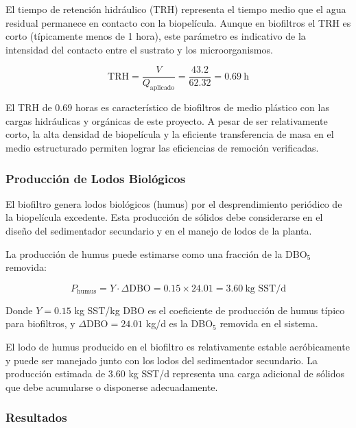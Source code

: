\documentclass[12pt,a4paper]{article}
\begin{document}
El tiempo de retención hidráulico (TRH) representa el tiempo medio que el agua residual permanece en contacto con la biopelícula. Aunque en biofiltros el TRH es corto (típicamente menos de 1 hora), este parámetro es indicativo de la intensidad del contacto entre el sustrato y los microorganismos.

\begin{equation}
\text{TRH} = \frac{V}{Q_{\text{aplicado}}} = \frac{43.2}{62.32} = 0.69\ \text{h}
\end{equation}

El TRH de 0.69 horas es característico de biofiltros de medio plástico con las cargas hidráulicas y orgánicas de este proyecto. A pesar de ser relativamente corto, la alta densidad de biopelícula y la eficiente transferencia de masa en el medio estructurado permiten lograr las eficiencias de remoción verificadas.

\subsubsection*{Producción de Lodos Biológicos}

El biofiltro genera lodos biológicos (humus) por el desprendimiento periódico de la biopelícula excedente. Esta producción de sólidos debe considerarse en el diseño del sedimentador secundario y en el manejo de lodos de la planta.

La producción de humus puede estimarse como una fracción de la DBO$_5$ removida:

\begin{equation}
P_{\text{humus}} = Y \cdot \Delta\text{DBO} = 0.15 \times 24.01 = 3.60\ \text{kg SST/d}
\end{equation}

Donde $Y = 0.15$ kg SST/kg DBO es el coeficiente de producción de humus típico para biofiltros, y $\Delta\text{DBO} = 24.01$ kg/d es la DBO$_5$ removida en el sistema.

El lodo de humus producido en el biofiltro es relativamente estable aeróbicamente y puede ser manejado junto con los lodos del sedimentador secundario. La producción estimada de 3.60 kg SST/d representa una carga adicional de sólidos que debe acumularse o disponerse adecuadamente.

\subsubsection{Resultados}
\end{document}

